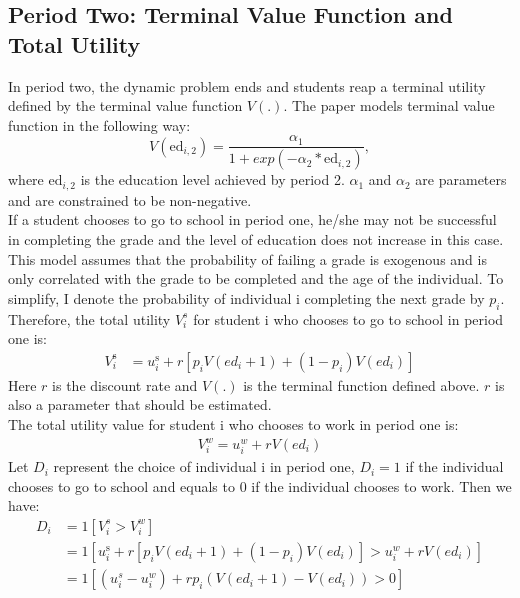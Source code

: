 \documentclass{handoutForSolutions}
\begin{document}
\subsection{Period Two: Terminal Value Function and Total Utility}
In period two, the dynamic problem ends and students reap a terminal utility defined by the terminal value function $V(.)$. The paper models terminal value function in the following way:
$$
V(\mathrm{e}\mathrm{d}_{i,2})=\frac{\alpha_ 1}{1+exp(-\alpha_2*\mathrm{e}\mathrm{d}_{i,2})},
$$
where $\mathrm{e}\mathrm{d}_{i,2}$ is the education level achieved by period 2. $\alpha_1$ and $\alpha_2$ are parameters and are constrained to be non-negative.\\
If a student chooses to go to school in period one, he/she may not be successful in completing the grade and the level of education does not increase in this case. This model assumes that the probability of failing a grade is exogenous and is only correlated with the grade to be completed and the age of the individual. To simplify, I denote the probability of individual i completing the next grade by $p_i$. Therefore, the total utility $V_i^s$ for student i who chooses to go to school in period one is:
\begin{equation*}
\begin{split}
    V_{i}^{\mathrm{s}}&=u_{i}^\mathrm{s}+r[p_{i}V(ed_i+1)+(1-p_{i})V(ed_i)]
\end{split}
\end{equation*}
Here $r$ is the discount rate and $V(.)$ is the terminal function defined above. $r$ is also a parameter that should be estimated.\\
The total utility value for student i who chooses to work in period one is:
\begin{equation*}
\begin{split}
     V_{i}^{w}=u_i^w+r V(ed_i)
\end{split}
\end{equation*}
Let $D_i$ represent the choice of individual i in period one, $D_i =1$ if the individual chooses to go to school and equals to 0 if the individual chooses to work. Then we have:
\begin{equation*}
\begin{split}
  D_i&=1[V_i^s>V_i^w]\\
    &=1[u_{i}^\mathrm{s}+r[p_{i}V(ed_i+1)+(1-p_{i})V(ed_i)]>u_i^w+rV(ed_i)]\\
    &=1[(u_i^s-u_i^w)+rp_i(V(ed_i+1)-V(ed_i))>0]  
\end{split}
\end{equation*}
\end{document}
